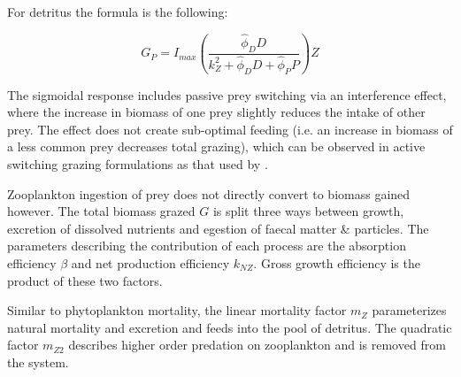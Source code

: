\documentclass[journal abbreviation, manuscript]{copernicus}
\begin{document}
For detritus the formula is the following:

\begin{equation}
    G_P = I_{max} \left( \frac{ \hat{\phi}_D D}{k_Z^2 + \hat{\phi}_D D +\hat{\phi}_P P}  \right) Z
\end{equation}

The sigmoidal response includes passive prey switching via an interference effect, where the increase in biomass of one prey slightly reduces the intake of other prey. The effect does not create sub-optimal feeding (i.e. an increase in biomass of a less common prey decreases total grazing), which can be observed in active switching grazing formulations as that used by \citet{Fasham1990a}.

Zooplankton ingestion of prey does not directly convert to biomass gained however. The total biomass grazed $G$ is split three ways between growth, excretion of dissolved nutrients and egestion of faecal matter \& particles. The parameters describing the contribution of each process are the absorption efficiency $\beta$ and net production efficiency $k_{NZ}$. Gross growth efficiency is the product of these two factors.  

Similar to phytoplankton mortality, the linear mortality factor $m_Z$ parameterizes natural mortality and excretion and feeds into the pool of detritus. The quadratic factor $m_{Z2}$ describes higher order predation on zooplankton and is removed from the system.

%
%
%
%
%
%
%
%
%
%
%
%
%
\end{document}
